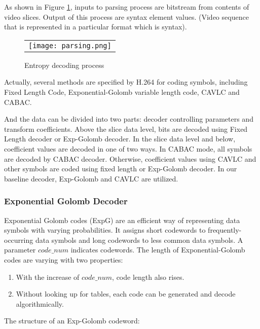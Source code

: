 \documentclass[../main.tex]{subfiles}
\begin{document}
As shown in Figure \ref{fig:parsing}, inputs to parsing process are bitstream from contents of video slices. Output of this process are syntax element values. (Video sequence that is represented in a particular format which is syntax).

\begin{figure} [ht]
\begin{center}
\begin{tabular}{c} %
\texttt{[image: parsing.png]}
\end{tabular}
\end{center}
\caption[parsing] 
{ \label{fig:parsing} Entropy decoding process}
\end{figure} 

Actually, several methods are specified by H.264 for coding symbols, including Fixed Length Code, Exponential-Golomb variable length code, CAVLC and CABAC. 

And the data can be divided into two parts: decoder controlling parameters and transform coefficients. Above the slice data level, bits are decoded using Fixed Length decoder or Exp-Golomb decoder. In the slice data level and below, coefficient values are decoded in one of two ways. In CABAC mode, all symbols are decoded by CABAC decoder. Otherwise, coefficient values using CAVLC and other symbols are coded using fixed length or Exp-Golomb decoder. In our baseline decoder, Exp-Golomb and CAVLC are utilized.

\subsubsection{ Exponential Golomb Decoder }

Exponential Golomb codes (ExpG) are an efficient way of representing data symbols with varying probabilities. It assigns short codewords to frequently-occurring data symbols and long codewords to less common data symbols. A parameter $code\_num$ indicates codewords. The length of Exponential-Golomb codes are varying with two properties:

\begin{enumerate}
\item With the increase of $code\_num$, code length also rises.
\item Without looking up for tables, each code can be generated and decode algorithmically. 
\end{enumerate}

The structure of an Exp-Golomb codeword:
\end{document}

